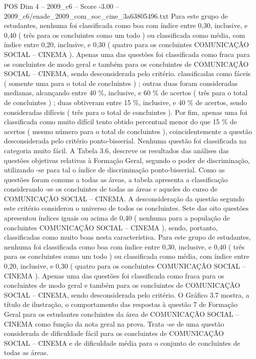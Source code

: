 \begin{textsample}{POS Dim 4 – 2009\_c6 – Score -3.00 – 2009\_c6/enade\_2009\_com\_soc\_cine\_3a63805496.txt}
Para este grupo de estudantes, nenhuma foi classificada como boa com índice entre 0,30, inclusive, e 0,40 ( três para os concluintes como um todo ) ou classificada como média, com índice entre 0,20, inclusive, e 0,30 ( quatro para os concluintes COMUNICAÇÃO SOCIAL – CINEMA ).
Apenas uma das questões foi classificada como fraca para os concluintes de modo geral e também para os concluintes de COMUNICAÇÃO SOCIAL – CINEMA, sendo desconsiderada pelo critério. classificadas como fáceis ( somente uma para o total de concluintes ) ; outras duas foram consideradas medianas, alcançando entre 40 \%, inclusive, e 60 \% de acertos ( três para o total de concluintes ) ; duas obtiveram entre 15 \%, inclusive, e 40 \% de acertos, sendo consideradas difíceis ( três para o total de concluintes ).
Por fim, apenas uma foi classificada como muito difícil tento obtido percentual menor do que 15 \% de acertos ( mesmo número para o total de concluintes ), coincidentemente a questão desconsiderada pelo critério ponto-bisserial.
Nenhuma questão foi classificada na categoria muito fácil.
A Tabela 3.6, descreve os resultados das análises das questões objetivas relativas à Formação Geral, segundo o poder de discriminação, utilizando -se para tal o índice de discriminação ponto-bisserial.
Como as questões foram comuns a todas as áreas, a tabela apresenta a classificação considerando -se os concluintes de todas as áreas e aqueles do curso de COMUNICAÇÃO SOCIAL – CINEMA.
A desconsideração da questão segundo este critério considerou o universo de todos os concluintes.
Sete das oito questões apresentou índices iguais ou acima de 0,40 ( nenhuma para a população de concluintes COMUNICAÇÃO SOCIAL – CINEMA ), sendo, portanto, classificadas como muito boas nesta característica.
Para este grupo de estudantes, nenhuma foi classificada como boa com índice entre 0,30, inclusive, e 0,40 ( três para os concluintes como um todo ) ou classificada como média, com índice entre 0,20, inclusive, e 0,30 ( quatro para os concluintes COMUNICAÇÃO SOCIAL – CINEMA ).
Apenas uma das questões foi classificada como fraca para os concluintes de modo geral e também para os concluintes de COMUNICAÇÃO SOCIAL – CINEMA, sendo desconsiderada pelo critério.
O Gráfico 3.7 mostra, a título de ilustração, o comportamento das respostas à questão 7 de Formação Geral para os estudantes concluintes da área de COMUNICAÇÃO SOCIAL – CINEMA como função da nota geral na prova.
Trata -se de uma questão considerada de dificuldade fácil para os concluintes de COMUNICAÇÃO SOCIAL – CINEMA e de dificuldade média para o conjunto de concluintes de todas as áreas.

\end{textsample}
